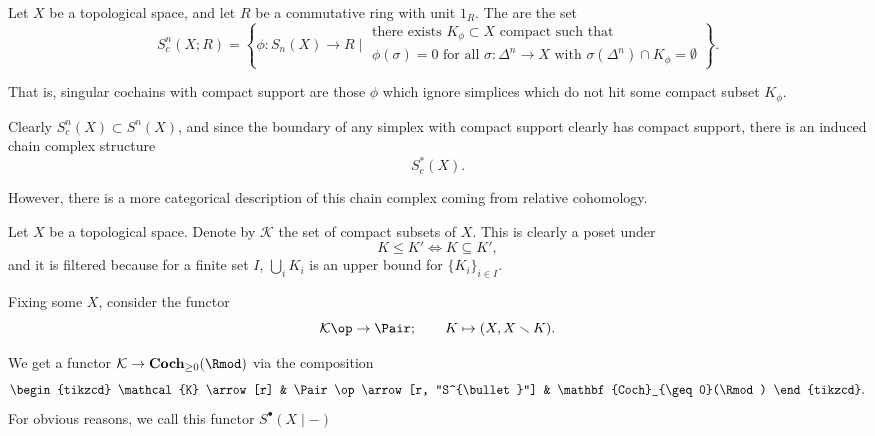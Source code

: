 \documentclass[main.tex]{subfiles}
\begin{document}
\begin{definition}
  \label{def:singular_cochains_with_compact_support}
  Let \(X\) be a topological space, and let \(R\) be a commutative ring with unit \(1_{R}\). The  are the set
  \begin{equation*}
    S^{n}_{c}(X ; R) = \left\{ \phi\colon S_{n}(X) \to R \mid \substack{\text{there exists } K_{\phi} \subset X \text{ compact such that } \\ \phi(\sigma) = 0 \text{ for all }\sigma\colon \Delta^{n} \to X \text{ with }\sigma(\Delta^{n}) \cap K_{\phi} = \emptyset } \right\}.
  \end{equation*}
\end{definition}
That is, singular cochains with compact support are those \(\phi\) which ignore simplices which do not hit some compact subset \(K_{\phi}\).

Clearly \(S^{n}_{c}(X) \subset S^{n}(X)\), and since the boundary of any simplex with compact support clearly has compact support, there is an induced chain complex structure
\begin{equation*}
  S^{*}_{c}(X).
\end{equation*}

However, there is a more categorical description of this chain complex coming from relative cohomology.

Let \(X\) be a topological space. Denote by \(\mathcal{K}\) the set of compact subsets of \(X\). This is clearly a poset under
\begin{equation*}
  K \leq K' \iff K \subseteq K',
\end{equation*}
and it is filtered because for a finite set \(I\), \(\bigcup_{i} K_{i}\) is an upper bound for \(\{K_{i}\}_{i \in I}\).

Fixing some \(X\), consider the functor
\begin{equation*}
  \mathcal{K}\op \to \Pair;\qquad K \mapsto (X, X \smallsetminus K).
\end{equation*}

We get a functor \(\mathcal{K} \to \mathbf{Coch}_{\geq 0}(\Rmod)\) via the composition
\begin{equation*}
  \begin{tikzcd}
    \mathcal{K}
    \arrow[r]
    & \Pair\op
    \arrow[r, "S^{\bullet}"]
    & \mathbf{Coch}_{\geq 0}(\Rmod)
  \end{tikzcd}.
\end{equation*}
For obvious reasons, we call this functor \(S^{\bullet}(X \mid -)\)
\end{document}
